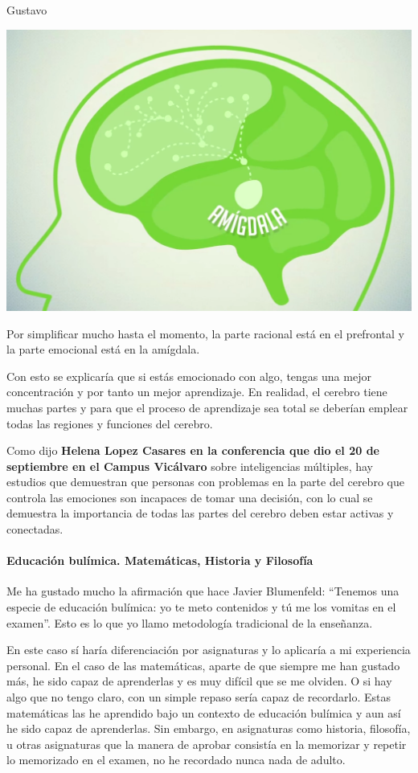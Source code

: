 \begin{opin}{\guscolor}{Gustavo}
\begin{minipage}[hbtp]{1.0\linewidth}
\centering
\includegraphics[scale=0.2]{img/cerebrogus.png}
\end{minipage}

Por simplificar mucho hasta el momento, la parte racional está en el prefrontal y la parte emocional está en la amígdala.


Con esto se explicaría que si estás emocionado con algo, tengas una mejor concentración y por tanto un mejor aprendizaje. En realidad, el cerebro tiene muchas partes y para que el proceso de aprendizaje sea total se deberían emplear todas las regiones y funciones del cerebro.


Como dijo \textbf{Helena Lopez Casares en la conferencia que dio el 20 de septiembre en el Campus Vicálvaro} sobre inteligencias múltiples, hay estudios que demuestran que personas con problemas en la parte del cerebro que controla las emociones son incapaces de tomar una decisión, con lo cual se demuestra la importancia de todas las partes del cerebro deben estar activas y conectadas.

\paragraph{Educación bulímica. Matemáticas, Historia y Filosofía}
Me ha gustado mucho la afirmación que hace Javier Blumenfeld: “Tenemos una especie de educación bulímica: yo te meto contenidos y tú me los vomitas en el examen”. Esto es lo que yo llamo metodología tradicional de la enseñanza.


En este caso sí haría diferenciación por asignaturas y lo aplicaría a mi experiencia personal. En el caso de las matemáticas, aparte de que siempre me han gustado más, he sido capaz de aprenderlas y es muy difícil que se me olviden. O si hay algo que no tengo claro, con un simple repaso sería capaz de recordarlo. Estas matemáticas las he aprendido bajo un contexto de educación bulímica y aun así he sido capaz de aprenderlas. Sin embargo, en asignaturas como historia, filosofía, u otras asignaturas que la manera de aprobar consistía en la memorizar y repetir lo memorizado en el examen, no he recordado nunca nada de adulto.



\end{opin}
